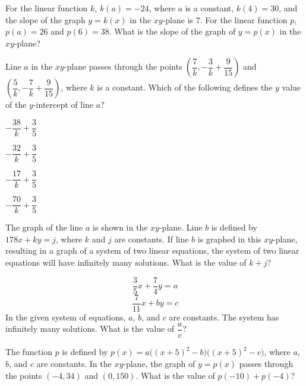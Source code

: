 \vfill
\clearpage
\noindent\begin{minipage}{\linewidth}
\par\smallskip
For the linear function $k$, $k(a)=-24$, where $a$ is a constant, $k(4)=30$, and the slope of the graph $y=k(x)$ in the $xy$-plane is 7. For the linear function $p$, $p(a)=26$ and $p(6)=38$. What is the slope of the graph of $y=p(x)$ in the $xy$-plane?
\end{minipage}
\vfill
\noindent\begin{minipage}{\linewidth}
\par\smallskip
Line $a$ in the $xy$-plane passes through the points $\left(\dfrac{7}{k},-\dfrac{3}{k}+\dfrac{9}{15}\right)$ and $\left(\dfrac{5}{k},-\dfrac{7}{k}+\dfrac{9}{15}\right)$, where $k$ is a constant. Which of the following defines the $y$ value of the $y$-intercept of line $a$?
\begin{satchoices}
  \item[A)] $-\dfrac{38}{k}+\dfrac{3}{5}$
  \item[B)] $-\dfrac{32}{k}+\dfrac{3}{5}$
  \item[C)] $-\dfrac{17}{k}+\dfrac{3}{5}$
  \item[D)] $-\dfrac{70}{k}+\dfrac{3}{5}$
\end{satchoices}
\end{minipage}
\vfill
\noindent\begin{minipage}{\linewidth}
\par\smallskip
The graph of the line $a$ is shown in the $xy$-plane. Line $b$ is defined by $178x+ky=j$, where $k$ and $j$ are constants. If line $b$ is graphed in this $xy$-plane, resulting in a graph of a system of two linear equations, the system of two linear equations will have infinitely many solutions. What is the value of $k+j$?
\satfig{\figlineaii}
\end{minipage}
\vfill
\clearpage
\noindent\begin{minipage}{\linewidth}
\par\smallskip
$$\frac{3}{5}x+\frac{7}{4}y=a$$ $$\frac{7}{11}x+by=c$$ In the given system of equations, $a$, $b$, and $c$ are constants. The system has infinitely many solutions. What is the value of $\dfrac{a}{c}$?
\end{minipage}
\vfill
\clearpage
{}
\noindent\begin{minipage}{\linewidth}
\par\smallskip
The function $p$ is defined by $p(x)=a\bigl((x+5)^2-b\bigr)\bigl((x+5)^2-c\bigr)$, where $a$, $b$, and $c$ are constants. In the $xy$-plane, the graph of $y=p(x)$ passes through the points $(-4,34)$ and $(0,150)$. What is the value of $p(-10)+p(-4)$?
\end{minipage}
